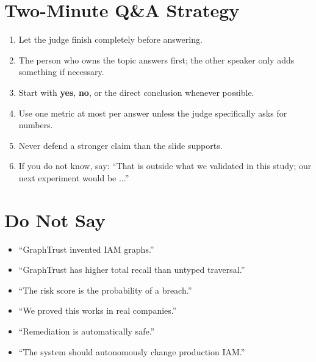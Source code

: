\documentclass[11pt,a4paper]{article}
\begin{document}
\section*{Two-Minute Q\&A Strategy}

\begin{enumerate}[leftmargin=1.5em,itemsep=0.25em]
  \item Let the judge finish completely before answering.
  \item The person who owns the topic answers first; the other speaker only adds something if necessary.
  \item Start with \textbf{yes}, \textbf{no}, or the direct conclusion whenever possible.
  \item Use one metric at most per answer unless the judge specifically asks for numbers.
  \item Never defend a stronger claim than the slide supports.
  \item If you do not know, say: ``That is outside what we validated in this study; our next experiment would be ...''
\end{enumerate}

\section*{Do Not Say}

\begin{itemize}[leftmargin=1.5em,itemsep=0.2em]
  \item ``GraphTrust invented IAM graphs.''
  \item ``GraphTrust has higher total recall than untyped traversal.''
  \item ``The risk score is the probability of a breach.''
  \item ``We proved this works in real companies.''
  \item ``Remediation is automatically safe.''
  \item ``The system should autonomously change production IAM.''
\end{itemize}
\end{document}
